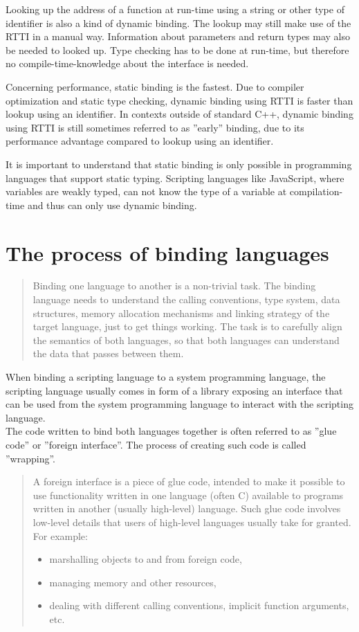 Looking up the address of a function at run-time using a string or other type of identifier is also a kind of dynamic binding. The lookup may still make use of the RTTI in a manual way. Information about parameters and return types may also be needed to looked up. Type checking has to be done at run-time, but therefore no compile-time-knowledge about the interface is needed.

Concerning performance, static binding is the fastest. Due to compiler optimization and static type checking, dynamic binding using RTTI is faster than lookup using an identifier. In contexts outside of standard C++, dynamic binding using RTTI is still sometimes referred to as ''early'' binding, due to its performance advantage compared to lookup using an identifier.

It is important to understand that static binding is only possible in programming languages that support static typing. Scripting languages like JavaScript, where variables are weakly typed, can not know the type of a variable at compilation-time and thus can only use dynamic binding.

\section{The process of binding languages}

\begin{quotation}
Binding one language to another is a non-trivial task. The binding language needs to understand the calling conventions, type system, data structures, memory allocation mechanisms and linking strategy of the target language, just to get things working. The task is to carefully align the semantics of both languages, so that both languages can understand the data that passes between them.
\end{quotation}

When binding a scripting language to a system programming language, the scripting language usually comes in form of a library exposing an interface that can be used from the system programming language to interact with the scripting language.\\
The code written to bind both languages together is often referred to as ''glue code'' or ''foreign interface''. The process of creating such code is called ''wrapping''.

\begin{quotation}
A foreign interface is a piece of glue code, intended to make it possible to use functionality written in one language (often C) available to programs written in another (usually high-level) language. Such glue code involves low-level details that users of high-level languages usually take for granted. For example:
\begin{itemize}
\item marshalling objects to and from foreign code,
\item managing memory and other resources,
\item dealing with different calling conventions, implicit function arguments, etc.
\end{itemize}
\end{quotation}


